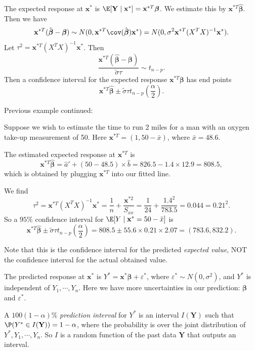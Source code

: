 \documentclass[a4paper]{article}
\begin{document}
The expected response at $\mathbf{x}^*$ is $\E[\mathbf{Y}\mid \mathbf{x}^*] = \mathbf{x}^{*T}\boldsymbol\beta$. We estimate this by $\mathbf{x}^{*T}\hat{\boldsymbol\beta}$. Then we have
\[
  \mathbf{x}^{*T}(\hat{\boldsymbol\beta} - \boldsymbol\beta)\sim N(0, \mathbf{x}^{*T} \cov(\hat{\boldsymbol\beta})\mathbf{x}^*) = N(0, \sigma^2\mathbf{x}^{*T}(X^TX)^{-1}\mathbf{x}^*).
\]
Let $\tau^2 = \mathbf{x}^{*T} (X^TX)^{-1}\mathbf{x}^*$. Then
\[
  \frac{\mathbf{x}^{*T}(\hat{\boldsymbol\beta} - \boldsymbol\beta)}{\tilde{\sigma}\tau}\sim t_{n - p}.
\]
Then a confidence interval for the expected response $\mathbf{x}^{*T}\boldsymbol\beta$ has end points
\[
  \mathbf{x}^{*T}\hat{\boldsymbol\beta} \pm \tilde{\sigma}\tau t_{n - p}\left(\frac{\alpha}{2}\right).
\]
\begin{eg}
  Previous example continued:

  Suppose we wish to estimate the time to run 2 miles for a man with an oxygen take-up measurement of 50. Here $\mathbf{x}^{*T} = (1, 50 - \bar x)$, where $\bar x = 48.6$.

  The estimated expected response at $\mathbf{x}^{*T}$ is
  \[
    \mathbf{x}^{*T}\hat{\boldsymbol\beta} = \hat{a}' + (50 - 48.5)\times \hat{b} = 826.5 - 1.4\times 12.9 = 808.5,
  \]
  which is obtained by plugging $\mathbf{x}^{*T}$ into our fitted line.

  We find
  \[
    \tau^2 = \mathbf{x}^{*T}(X^TX)^{-1}\mathbf{x}^* = \frac{1}{n} + \frac{\mathbf{x}^{*2}}{S_{xx}} = \frac{1}{24} + \frac{1.4^2}{783.5} = 0.044 = 0.21^2.
  \]
  So a $95\%$ confidence interval for $\E[Y\mid \mathbf{x}^* = 50 - \bar x]$ is
  \[
    \mathbf{x}^{*T}\hat{\boldsymbol\beta}\pm \tilde{\sigma}\tau t_{n - p}\left(\frac{\alpha}{2}\right) = 808.5 \pm 55.6 \times 0.21 \times 2.07 = (783.6, 832.2).
  \]
\end{eg}
Note that this is the confidence interval for the predicted \emph{expected value}, NOT the confidence interval for the actual obtained value.

The predicted response at $\mathbf{x}^*$ is $Y^* = \mathbf{x}^*\boldsymbol\beta + \varepsilon^*$, where $\varepsilon^*\sim N(0, \sigma^2)$, and $Y^*$ is independent of $Y_1, \cdots, Y_n$. Here we have more uncertainties in our prediction: $\boldsymbol\beta$ and $\varepsilon^*$.

A $100(1 - \alpha)\%$ \emph{prediction interval} for $Y^*$ is an interval $I(\mathbf{Y})$ such that $\P(Y^*\in I(\mathbf{Y})) = 1 - \alpha$, where the probability is over the joint distribution of $Y^*, Y_1, \cdots, Y_n$. So $I$ is a random function of the past data $\mathbf{Y}$ that outputs an interval.
\end{document}
